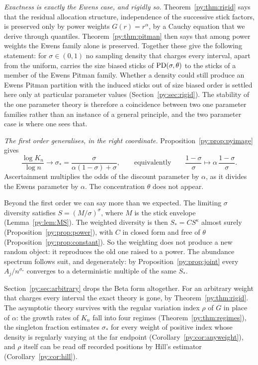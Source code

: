 \emph{Exactness is exactly the Ewens case, and rigidly so.} Theorem~\ref{py:thm:rigid} says that the
residual allocation structure, independence of the successive stick factors, is preserved only by
power weights $G(r) = r^{\alpha}$, by a Cauchy equation that we derive through quantiles.
Theorem~\ref{py:thm:pitman} then says that among power weights the Ewens family alone is preserved.
Together these give the following statement: for $\sigma \in (0,1)$ no
sampling density that charges every interval, apart from the uniform, carries the size biased sticks of $\mathrm{PD}(\sigma,\theta)$ to the sticks of a member of the Ewens Pitman family. Whether a density could still produce an Ewens Pitman partition with the induced sticks out of size biased order is settled here only at particular parameter values (Section~\ref{py:sec:rigid}). The stability of the one parameter theory is therefore a coincidence between two
one parameter families rather than an instance of a general principle, and the two parameter case is
where one sees that.

\emph{The first order generalises, in the right coordinate.} Proposition~\ref{py:prop:pyimage} gives
\[
\frac{\log K_n}{\log n} \longrightarrow \sigma_* = \frac{\sigma}{\alpha(1-\sigma)+\sigma},
\qquad\text{equivalently}\qquad
\frac{1-\sigma}{\sigma} \longmapsto \alpha\,\frac{1-\sigma}{\sigma} .
\]
Ascertainment multiplies the odds of the discount parameter by $\alpha$, as it divides the Ewens
parameter by $\alpha$. The concentration $\theta$ does not appear.

Beyond the first order we can say more than we expected. The limiting $\sigma$ diversity satisfies
$S = (M/\sigma)^{\sigma}$, where $M$ is the stick envelope (Lemma~\ref{py:lem:MS}). The weighted
diversity is then $S_* = C S^{\kappa}$ almost surely (Proposition~\ref{py:prop:power}), with $C$ in
closed form and free of $\theta$ (Proposition~\ref{py:prop:constant}). So the weighting does not
produce a new random object: it reproduces the old one raised to a power. The abundance spectrum
follows suit, and degenerately: by Proposition~\ref{py:prop:joint} every $A_j/n^{\sigma_*}$ converges
to a deterministic multiple of the same $S_*$.

Section~\ref{py:sec:arbitrary} drops the Beta form altogether. For an arbitrary weight that charges every interval the exact theory
is gone, by Theorem~\ref{py:thm:rigid}. The asymptotic theory survives with the regular variation index
$\rho$ of $G$ in place of $\alpha$: the growth rates of $K_n$ fall into four regimes
(Theorem~\ref{py:thm:regimes}), the singleton fraction estimates $\sigma_*$ for every weight of positive index whose density is regularly varying at the far endpoint
(Corollary~\ref{py:cor:anyweight}), and $\rho$ itself can be read off recorded positions by Hill's
estimator (Corollary~\ref{py:cor:hill}).

